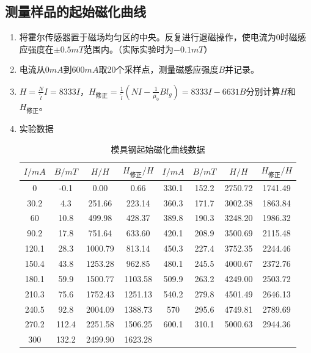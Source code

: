 \documentclass[11pt]{article}
\begin{document}
\subsection{测量样品的起始磁化曲线}
\begin{enumerate}
    \item 将霍尔传感器置于磁场均匀区的中央。反复进行退磁操作，使电流为0时磁感应强度在$\pm 0.5mT$范围内。（实际实验时为$-0.1mT$）
    \item 电流从$0mA$到$600mA$取20个采样点，测量磁感应强度$B$并记录。
    \item $H=\frac{N}{\tilde{l}}I=8333I$，$H_{\text{修正}}=\frac{1}{\tilde{l}} \left(NI-\frac{1}{\mu_0}Bl_g\right)=8333I-6631B$分别计算$H$和$H_{\text{修正}}$。
    \item 实验数据
        \begin{table}[H]
          \centering
          \caption{模具钢起始磁化曲线数据}
            \begin{tabular}{|c|c|c|c|c|c|c|c|}\hline
            $I/mA$ & $B/mT$ & $H/H$ & $H_{\text{修正}}/H$ & $I/mA$ & $B/mT$ & $H/H$ & $H_{\text{修正}}/H$ \\\hline
            0      & -0.1   & 0.00   & 0.66   & 330.1  & 152.2  & 2750.72  & 1741.49  \\\hline
            30.2   & 4.3    & 251.66  & 223.14  & 360.3  & 171.7  & 3002.38  & 1863.84  \\\hline
            60     & 10.8   & 499.98  & 428.37  & 389.8  & 190.3  & 3248.20  & 1986.32  \\\hline
            90.2   & 17.8   & 751.64  & 633.60  & 420.1  & 208.9  & 3500.69  & 2115.48  \\\hline
            120.1  & 28.3   & 1000.79  & 813.14  & 450.3  & 227.4  & 3752.35  & 2244.46  \\\hline
            150.4  & 43.8   & 1253.28  & 962.85  & 480.1  & 245.5  & 4000.67  & 2372.76  \\\hline
            180.1  & 59.9   & 1500.77  & 1103.58  & 509.9  & 263.2  & 4249.00  & 2503.72  \\\hline
            210.3  & 75.6   & 1752.43  & 1251.13  & 540.2  & 279.8  & 4501.49  & 2646.13  \\\hline
            240.5  & 92.8   & 2004.09  & 1388.73  & 570    & 295.6  & 4749.81  & 2789.69  \\\hline
            270.2  & 112.4  & 2251.58  & 1506.25  & 600.1  & 310.1  & 5000.63  & 2944.36  \\\hline
            300    & 132.2  & 2499.90  & 1623.28  &        &        &        &  \\\hline


\end{tabular}
\end{table}
\end{enumerate}
\end{document}
